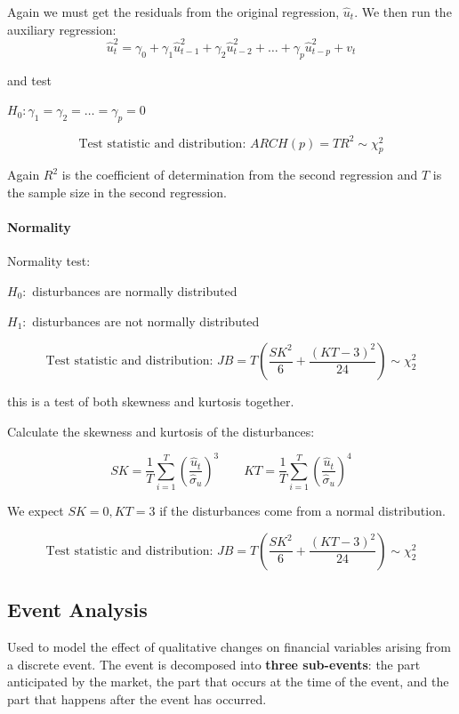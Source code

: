 \documentclass[11pt]{article}
\begin{document}
Again we must get the residuals from the original regression, $\hat{u}_t$. We then run the auxiliary regression:
\begin{equation}
    \hat{u}_t^2=\gamma_0+\gamma_1 \hat{u}_{t-1}^2+\gamma_2 \hat{u}_{t-2}^2+\ldots+\gamma_p \hat{u}_{t-p}^2+v_t
\end{equation}

and test

$H_0: \gamma_1 = \gamma_2 = \ldots = \gamma_p = 0$

\[\text{Test statistic and distribution: } ARCH(p) = TR^2 \sim \chi_p^2\]

Again $R^2$ is the coefficient of determination from the second regression and $T$ is the sample size in the second regression. 

\paragraph{Normality} \mbox{}

\begin{mdframed}
    Normality test:

    $H_0:$ disturbances are normally distributed

    $H_1:$ disturbances are not normally distributed

    \[\text{Test statistic and distribution: } J B =T\left(\frac{S K^2}{6}+\frac{(K T-3)^2}{24}\right) \sim \chi_2^2\]
\end{mdframed}

\begin{note}
    this is a test of both skewness and kurtosis together.
\end{note}

Calculate the skewness and kurtosis of the disturbances:

\[SK = \dfrac{1}{T} \sum_{i=1}^T \left(\dfrac{\hat{u}_t}{\hat{\sigma}_u}\right)^3 \qquad KT = \dfrac{1}{T} \sum_{i=1}^T \left(\dfrac{\hat{u}_t}{\hat{\sigma}_u}\right)^4\]

We expect $SK=0, KT=3$ if the disturbances come from a normal distribution.

 \[\text{Test statistic and distribution: } J B =T\left(\frac{S K^2}{6}+\frac{(K T-3)^2}{24}\right) \sim \chi_2^2\]

 \subsection{Event Analysis}

 Used to model the effect of qualitative changes on financial variables arising from a discrete event. The event is decomposed into \textbf{three sub-events}: the part anticipated by the market, the part that occurs at the time of the event, and the part that happens after the event has occurred.
\end{document}
